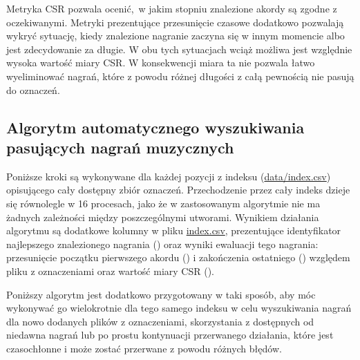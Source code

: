 Metryka CSR pozwala ocenić, w jakim stopniu znalezione akordy są zgodne z oczekiwanymi. Metryki prezentujące przesunięcie czasowe dodatkowo pozwalają wykryć sytuację, kiedy znalezione nagranie zaczyna się w innym momencie albo jest zdecydowanie za długie. W obu tych sytuacjach wciąż możliwa jest względnie wysoka wartość miary CSR. W konsekwencji miara ta nie pozwala łatwo wyeliminować nagrań, które z powodu różnej długości z całą pewnością nie pasują do oznaczeń.

\subsection{Algorytm automatycznego wyszukiwania pasujących nagrań muzycznych}

Poniższe kroki są wykonywane dla każdej pozycji z indeksu (\url{data/index.csv}) opisującego cały dostępny zbiór oznaczeń. Przechodzenie przez cały indeks dzieje się równolegle w 16 procesach, jako że w zastosowanym algorytmie nie ma żadnych zależności między poszczególnymi utworami. Wynikiem działania algorytmu są dodatkowe kolumny w pliku \url{index.csv}, prezentujące identyfikator najlepszego znalezionego nagrania () oraz wyniki ewaluacji tego nagrania: przesunięcie początku pierwszego akordu () i zakończenia ostatniego () względem pliku z oznaczeniami oraz wartość miary CSR ().

Poniższy algorytm jest dodatkowo przygotowany w taki sposób, aby móc wykonywać go wielokrotnie dla tego samego indeksu w celu wyszukiwania nagrań dla nowo dodanych plików z oznaczeniami, skorzystania z dostępnych od niedawna nagrań lub po prostu kontynuacji przerwanego działania, które jest czasochłonne i może zostać przerwane z powodu różnych błędów.

